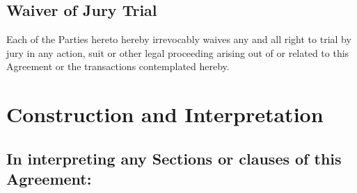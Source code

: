 \documentclass{article}
\begin{document}
\subsection{Waiver of Jury Trial}\label{subsec:waiver_jury_trial}

Each of the Parties hereto hereby irrevocably waives any and all right to trial by jury in any action, suit or other legal proceeding arising out of or related to this Agreement or the transactions contemplated hereby.

\section{Construction and Interpretation}\label{sec:construction}

\subsection{In interpreting any Sections or clauses of this Agreement:}\label{subsec:interpretation}
\end{document}
